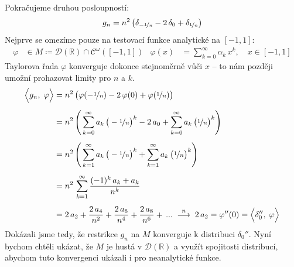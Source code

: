 \documentclass{article}
\def\R{\mathbb{R}}
\def\D{\mathcal{D}}
\def\Cont{\mathcal{C}}
\begin{document}
\bigskip

Pokračujeme druhou posloupností:
\begin{equation*}
    g_n =
    n^2 \, \big(
        \delta_{-\nicefrac{1}{n}}
        -2 \, \delta_0
        + \delta_{\nicefrac{1}{n}}
    \big)
\end{equation*}
Nejprve se omezíme pouze na testovací funkce analytické na $[-1, 1]$:
\begin{align*}
    \varphi &\in M \coloneqq \D( \R ) \cap \Cont^\omega([-1,1])
    &
    \varphi(x) &= \sum_{k=0}^\infty \alpha_k \, x^k,
    \quad x \in [-1, 1]
\end{align*}
Taylorova řada $\varphi$ konverguje dokonce stejnoměrně vůči $x$ – to nám později umožní prohazovat limity pro $n$ a $k$.
\begin{align*}
    \Big< g_n, \; \varphi \Big>
    &= n^2 \, \big(
        \varphi(-\nicefrac{1}{n})
        -2 \, \varphi(0)
        + \varphi(\nicefrac{1}{n})
    \big)
    \\[5pt]
    &= n^2 \, \Bigg(
        \sum_{k=0}^\infty a_k \, \big( -\nicefrac{1}{n} \big)^k
        - 2 \, a_0
        + \sum_{k=0}^\infty a_k \, \big( \nicefrac{1}{n} \big)^k
    \Bigg)
    \\[5pt]
    &= n^2 \, \Bigg(
        \sum_{k=1}^\infty a_k \, \big( -\nicefrac{1}{n} \big)^k
        + \sum_{k=1}^\infty a_k \, \big( \nicefrac{1}{n} \big)^k
    \Bigg)
    \\[5pt]
    &= n^2 \, \sum_{k=1}^\infty
    \frac{(-1)^k \, a_k + a_k}{n^k}
    \\[5pt]
    &= 2 \, a_2
    + \frac{2 \, a_4}{n^2}
    + \frac{2 \, a_6}{n^4}
    + \frac{2 \, a_8}{n^6}
    + \, ...
    \;\stackrel{n}{\longrightarrow}\;
    2 \, a_2 = \varphi''(0) = \Big< \delta_0'', \; \varphi \Big>
\end{align*}
Dokázali jsme tedy, že restrikce $g_n$ na $M$ konverguje k distribuci $\delta_0''$. Nyní bychom chtěli ukázat, že $M$ je hustá v $\D(\R)$ a využít spojitosti distribucí, abychom tuto konvergenci ukázali i pro neanalytické funkce.

\bigskip
\end{document}
